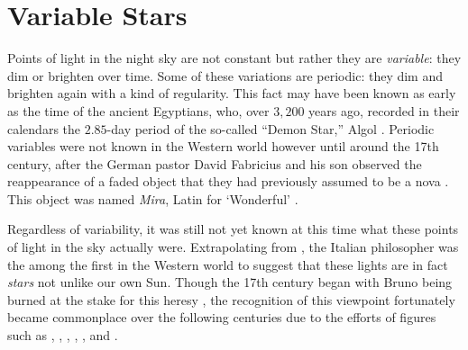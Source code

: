 \section{Variable Stars} 
\label{sec:history}
\iffalse
\begin{shaded}
\noindent This section aims to give the reader a background on the history of intrinsically variable stars, with an emphasis on their instrumental role in the development of the theory of stellar evolution. 
For the interested reader, the following texts contain more details: 
\citet{1958HDP....51..353L} give a thorough overview of variable stars up until the 1950s; 
\citet{ARNY1990211} gives the history of stellar evolution, including later phases of evolution which are not covered here; 
\citet{2016lrsp...13....2b} gives the history of solar oscillations;
\citet{bolt2007biographical} contains an encyclopedia of biographies for astronomers;
and \citet{2015pust.book.....C} talk about something. 
\end{shaded}
\fi

Points of light in the night sky are not constant but rather they are \emph{variable}: they dim or brighten over time. 
Some of these variations are periodic: they dim and brighten again with a kind of regularity. 
This fact may have been known as early as the time of the ancient Egyptians, who, over $3,200$ years ago, recorded in their calendars the $2.85$-day period of the so-called ``Demon Star,'' Algol \citep[e.g.,][]{jetsu2015shifting}. 
Periodic variables were not known in the Western world however until around the 17th century, after the German pastor David Fabricius and his son observed the reappearance of a faded object that they had previously assumed to be a nova \citep[e.g.,][]{2015pust.book.....C}. 
This object was named \emph{Mira}, Latin for `Wonderful' \citep{hevelius}. 

Regardless of variability, it was still not yet known at this time what these points of light in the sky actually were. 
Extrapolating from \citet{copernicus}, the Italian philosopher  %
was the among the first in the Western world to suggest that these lights are in fact \emph{stars} not unlike our own Sun. 
Though the 17th century began with Bruno being burned at the stake for this heresy \citep[e.g.,][]{bruno1998giordano}, the recognition of this viewpoint fortunately became commonplace over the following centuries due to the efforts of figures such as \citet{kepler}, , \citet{newton}, \citet{huygens}, \citet{1838AN.....16...65B}, and \citet{sacchi}. 

